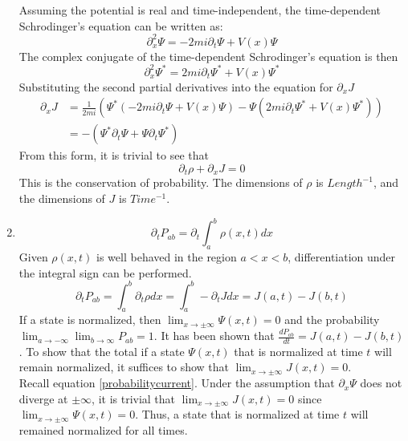 \begin{sol}
\begin{enumerate}[label=\textbf{(\alph*)}]
    Assuming the potential is real and time-independent, the time-dependent Schrodinger's equation can be written as:
    \begin{equation}
        \partial_x^2\Psi=-2mi\partial_t\Psi+V(x)\Psi 
    \end{equation}
    The complex conjugate of the time-dependent Schrodinger's equation is then
    \begin{equation}
        \partial_x^2\Psi^*=2mi\partial_t\Psi^*+V(x)\Psi^*
    \end{equation}
    Substituting the second partial derivatives into the equation for $\partial_xJ$
    \begin{equation}
        \begin{aligned}
            \partial_xJ&=\frac{1}{2mi}\left(\Psi^*\left(-2mi\partial_t\Psi+V(x)\Psi\right)-\Psi\left(2mi\partial_t\Psi^*+V(x)\Psi^*\right)\right)\\
            &=-\left(\Psi^*\partial_t\Psi+\Psi\partial_t\Psi^*\right)
        \end{aligned}
    \end{equation}
    From this form, it is trivial to see that
    \begin{equation}
        \partial_t\rho+\partial_xJ=0
    \end{equation}
    This is the conservation of probability. The dimensions of $\rho$ is $Length^{-1}$, and the dimensions of $J$ is $Time^{-1}$.
   \item
   \begin{equation}
       \partial_tP_{ab}=\partial_t\int_{a}^{b}\rho(x,t)dx
   \end{equation}
   Given $\rho(x,t)$ is well behaved in the region $a<x<b$, differentiation under the integral sign can be performed.
   \begin{equation}
    \partial_tP_{ab}=\int_{a}^{b}\partial_t\rho dx=
    \int_{a}^{b}-\partial_tJdx=J(a,t)-J(b,t)
   \end{equation}
   If a state is normalized, then $\lim_{x\to\pm\infty}\Psi(x,t)=0$ and the probability $\lim_{a\to-\infty}\lim_{b\to\infty}P_{ab}=1$. It has been shown that $\frac{dP_{ab}}{dt}=J(a,t)-J(b,t)$. To show that the total if a state $\Psi(x,t)$ that is normalized at time $t$ will remain normalized, it suffices to show that $\lim_{x\to\pm\infty}J(x,t)=0$. \\
   Recall equation \eqref{probabilitycurrent}. Under the assumption that $\partial_x\Psi$ does not diverge at $\pm\infty$, it is trivial that $\lim_{x\to\pm\infty}J(x,t)=0$ since $\lim_{x\to\pm\infty}\Psi(x,t)=0$. Thus, a state that is normalized at time $t$ will remained normalized for all times.

\end{enumerate}
\end{sol}
